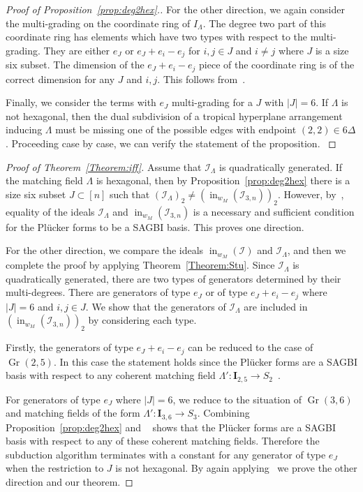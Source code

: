 \documentclass[ALCO,ThmDefs,Unicode,epreuves]{cedram}
\DeclareMathOperator{\Gr}{Gr}
\DeclareMathOperator{\ini}{in}
\newcommand{\I}{\mathcal{I}}
\begin{document}
\begin{proof}[Proof of Proposition~\ref{prop:deg2hex}.]
For the other direction, we again consider the multi-grading on the coordinate ring of $I_{\Lambda}$. The degree two part of this coordinate ring has elements which have two types with respect to the multi-grading. They are either $e_J$ or $e_J + e_i - e_j$ for $i, j \in J$ and $i \neq j $ where $J$ is a size six subset. The dimension of the $e_J + e_i - e_j$ piece of the coordinate ring is of the correct dimension for any $J$ and $i, j$. This follows from~\cite[Corollary~4.4]{SpeyerSturmfels}.


{Finally, we consider the terms with $e_J$ multi-grading for a $J$ with $|J| = 6$. If $\Lambda$ is not hexagonal, then the dual subdivision of a tropical hyperplane arrangement inducing $\Lambda$ must be missing one of the possible edges with endpoint $(2, 2) \in 6 \Delta$. Proceeding case by case, we can verify the statement of the proposition. }
\end{proof}



\begin{proof}[Proof of Theorem~\ref{Theorem:iff}]


Assume that $\I_\Lambda $ is quadratically generated. If the matching field $\Lambda$ is hexagonal, then by Proposition~\ref{prop:deg2hex} there is a size six subset $J \subset [n]$ such that $(\I_{\Lambda})_2 \neq (\ini_{w_M}(\I_{3,n}))_2$. 
However, by~\cite[Theorem~11.4]{sturmfels1996grobner}, equality of the ideals $\I_{\Lambda}$ and $\ini_{w_M}(\I_{3,n})$ is a necessary and sufficient condition for the Pl{\"u}cker forms to be a SAGBI basis. This proves one direction. 


For the other direction, 
we compare the ideals $\ini_{w_M}(\I)$ and $\I_\Lambda$, and then we complete the proof by applying Theorem~\ref{Theorem:Stu}.
Since $\I_\Lambda$ is quadratically generated, there are two types of generators determined by their multi-degrees. There are generators of type $e_J$ or of type $e_J + e_i - e_j$ where $|J| = 6$ and $i, j \in J$. We show that the generators of $\I_{\Lambda}$ are included in $(\ini_{w_M}(\I_{3,n}))_2$ by considering each type. 

Firstly, the generators of type $e_J +e_i -e_j$ can be reduced to the case of $\Gr(2,5)$.
 In this case the statement holds since the Pl{\"u}cker forms are a SAGBI basis with respect to any coherent matching field $\Lambda' \colon \mathbf{I}_{2, 5} \to S_2$~\cite{SpeyerSturmfels}. 


For generators of type $e_J$ where $|J| = 6$, we reduce to the situation of $\Gr(3, 6)$ and matching fields of the form $\Lambda' \colon \mathbf{I}_{3, 6} \to S_3$. 
Combining Proposition~\ref{prop:deg2hex} and 
~\cite[Theorem~11.4]{sturmfels1996grobner} shows that the Pl{\"u}cker forms are a SAGBI basis with respect to any of these coherent matching fields. Therefore the subduction algorithm terminates with a constant for any generator of type $e_J$ when the restriction to $J$ is not hexagonal. By again applying~\cite[Corollary~11.5]{sturmfels1996grobner} we prove the other direction and our theorem. 
\end{proof}
\end{document}
